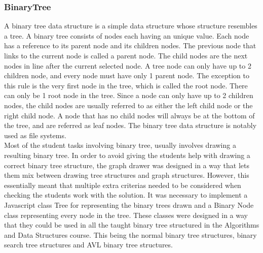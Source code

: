 \subsubsection{BinaryTree}
A binary tree data structure is a simple data structure whose structure resembles a tree. A binary tree consists of nodes each having an unique value. Each node has a reference to its parent node and its children nodes. The previous node that links to the current node is called a parent node. The child nodes are the next nodes in line after the current selected node. A tree node can only have up to 2 children node, and every node must have only 1 parent node. The exception to this rule is the very first node in the tree, which is called the root node. There can only be 1 root node in the tree. Since a node can only have up to 2 children nodes, the child nodes are usually referred to as either the left child node or the right child node. A node that has no child nodes will always be at the bottom of the tree, and are referred as leaf nodes. The binary tree data structure is notably used as file systems. 
\\[11pt]
Most of the student tasks involving binary tree, usually involves drawing a resulting binary tree. In order to avoid giving the students help with drawing a correct binary tree structure, the graph drawer was designed in a way that lets them mix between drawing tree structures and graph structures. However, this essentially meant that multiple extra criterias  needed to be considered when checking the students work with the solution. It was necessary to implement a Javascript class Tree for representing the binary trees drawn and a Binary Node class representing every node in the tree. These classes were designed in a way that they could be used in all the taught binary tree structured in the Algorithms and Data Structures course. This being the normal binary tree structures, binary search tree structures and AVL binary tree structures. 
\\[11pt]
